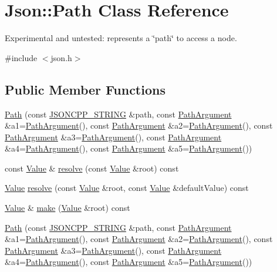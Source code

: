 \hypertarget{class_json_1_1_path}{}\section{Json\+:\+:Path Class Reference}
\label{class_json_1_1_path}


Experimental and untested\+: represents a \char`\"{}path\char`\"{} to access a node.  




{\ttfamily \#include $<$json.\+h$>$}

\subsection*{Public Member Functions}
\begin{DoxyCompactItemize}
\item 
\hyperlink{class_json_1_1_path_a7356c0e9c1fc2276390fd396271c1300}{Path} (const \hyperlink{config_8h_a1e723f95759de062585bc4a8fd3fa4be}{J\+S\+O\+N\+C\+P\+P\+\_\+\+S\+T\+R\+I\+NG} \&path, const \hyperlink{class_json_1_1_path_argument}{Path\+Argument} \&a1=\hyperlink{class_json_1_1_path_argument}{Path\+Argument}(), const \hyperlink{class_json_1_1_path_argument}{Path\+Argument} \&a2=\hyperlink{class_json_1_1_path_argument}{Path\+Argument}(), const \hyperlink{class_json_1_1_path_argument}{Path\+Argument} \&a3=\hyperlink{class_json_1_1_path_argument}{Path\+Argument}(), const \hyperlink{class_json_1_1_path_argument}{Path\+Argument} \&a4=\hyperlink{class_json_1_1_path_argument}{Path\+Argument}(), const \hyperlink{class_json_1_1_path_argument}{Path\+Argument} \&a5=\hyperlink{class_json_1_1_path_argument}{Path\+Argument}())
\item 
const \hyperlink{class_json_1_1_value}{Value} \& \hyperlink{class_json_1_1_path_ad1abdc54d2e03fc0e9436c3b9fd55a33}{resolve} (const \hyperlink{class_json_1_1_value}{Value} \&root) const
\item 
\hyperlink{class_json_1_1_value}{Value} \hyperlink{class_json_1_1_path_ab65ab001ccdbc6f8b5f123da58b92539}{resolve} (const \hyperlink{class_json_1_1_value}{Value} \&root, const \hyperlink{class_json_1_1_value}{Value} \&default\+Value) const
\item 
\hyperlink{class_json_1_1_value}{Value} \& \hyperlink{class_json_1_1_path_a858f9426f0f7bbe0450644d72b44e26b}{make} (\hyperlink{class_json_1_1_value}{Value} \&root) const
\item 
\hyperlink{class_json_1_1_path_a7356c0e9c1fc2276390fd396271c1300}{Path} (const \hyperlink{config_8h_a1e723f95759de062585bc4a8fd3fa4be}{J\+S\+O\+N\+C\+P\+P\+\_\+\+S\+T\+R\+I\+NG} \&path, const \hyperlink{class_json_1_1_path_argument}{Path\+Argument} \&a1=\hyperlink{class_json_1_1_path_argument}{Path\+Argument}(), const \hyperlink{class_json_1_1_path_argument}{Path\+Argument} \&a2=\hyperlink{class_json_1_1_path_argument}{Path\+Argument}(), const \hyperlink{class_json_1_1_path_argument}{Path\+Argument} \&a3=\hyperlink{class_json_1_1_path_argument}{Path\+Argument}(), const \hyperlink{class_json_1_1_path_argument}{Path\+Argument} \&a4=\hyperlink{class_json_1_1_path_argument}{Path\+Argument}(), const \hyperlink{class_json_1_1_path_argument}{Path\+Argument} \&a5=\hyperlink{class_json_1_1_path_argument}{Path\+Argument}())

\end{DoxyCompactItemize}

